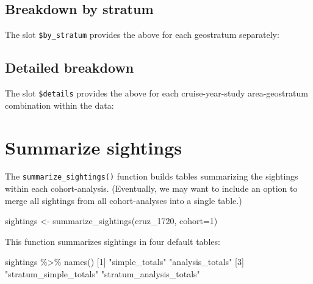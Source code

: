 \documentclass[
]{book}
\newenvironment{Shaded}{\begin{snugshade}}{\end{snugshade}}
\newcommand{\AttributeTok}[1]{\textcolor[rgb]{0.77,0.63,0.00}{#1}}
\newcommand{\DecValTok}[1]{\textcolor[rgb]{0.00,0.00,0.81}{#1}}
\newcommand{\FunctionTok}[1]{\textcolor[rgb]{0.00,0.00,0.00}{#1}}
\newcommand{\NormalTok}[1]{#1}
\newcommand{\OtherTok}[1]{\textcolor[rgb]{0.56,0.35,0.01}{#1}}
\newcommand{\SpecialCharTok}[1]{\textcolor[rgb]{0.00,0.00,0.00}{#1}}
\newcommand{\StringTok}[1]{\textcolor[rgb]{0.31,0.60,0.02}{#1}}
\begin{document}
\hypertarget{breakdown-by-stratum}{%
\subsection*{Breakdown by stratum}\label{breakdown-by-stratum}}

The slot \texttt{\$by\_stratum} provides the above for each geostratum separately:

\hypertarget{detailed-breakdown}{%
\subsection*{Detailed breakdown}\label{detailed-breakdown}}

The slot \texttt{\$details} provides the above for each cruise-year-study area-geostratum combination within the data:

\hypertarget{summarize-sightings}{%
\section*{Summarize sightings}\label{summarize-sightings}}

The \texttt{summarize\_sightings()} function builds tables summarizing the sightings within each cohort-analysis. (Eventually, we may want to include an option to merge all sightings from all cohort-analyses into a single table.)

\begin{Shaded}
\begin{Highlighting}[]
\NormalTok{sightings }\OtherTok{\textless{}{-}} \FunctionTok{summarize\_sightings}\NormalTok{(cruz\_1720,}
                                 \AttributeTok{cohort=}\DecValTok{1}\NormalTok{)}
\end{Highlighting}
\end{Shaded}

This function summarizes sightings in four default tables:

\begin{Shaded}
\begin{Highlighting}[]
\NormalTok{sightings }\SpecialCharTok{\%\textgreater{}\%}  \FunctionTok{names}\NormalTok{()}
\NormalTok{[}\DecValTok{1}\NormalTok{] }\StringTok{"simple\_totals"}           \StringTok{"analysis\_totals"}        
\NormalTok{[}\DecValTok{3}\NormalTok{] }\StringTok{"stratum\_simple\_totals"}   \StringTok{"stratum\_analysis\_totals"}
\end{Highlighting}
\end{Shaded}
\end{document}
